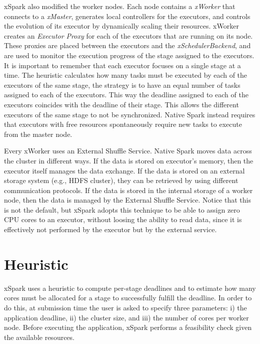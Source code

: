 xSpark also modified the worker nodes. Each node contains a \textit{xWorker} that connects to a \textit{xMaster}, generates local controllers for the executors, and controls the evolution of its executor by dynamically scaling their resources. xWorker creates an \textit{Executor Proxy} for each of the executors that are running on its node. These proxies are placed between the executors and the \textit{xSchedulerBackend}, and are used to monitor the execution progress of the stage assigned to the executors. It is important to remember that each executor focuses on a single stage at a time. The heuristic calculates how many tasks must be executed by each of the executors of the same stage, the strategy is to have an equal number of tasks assigned to each of the executors. This way the deadline assigned to each of the executors coincides with the deadline of their stage. This allows the different executors of the same stage to
not be synchronized. Native Spark instead requires that executors with free resources spontaneously require new tasks to execute from the master node. 

Every xWorker uses an External Shuffle Service. Native Spark moves data across the cluster in different ways. If the data is stored on executor’s memory, then the executor itself manages the data exchange. If the data is stored on an external storage system (e.g., HDFS cluster),
they can be retrieved by using different communication protocols. If the data is stored in the internal storage of a worker node, then the data is managed by the External Shuffle Service. Notice that this is not the default, but xSpark adopts this technique to be able to assign
zero CPU cores to an executor, without loosing the ability to read data, since it is effectively not performed by the executor but by the external service.

\section{Heuristic}\label{sec:heuristic}
xSpark uses a heuristic to compute per-stage deadlines and to estimate how many cores must be allocated for a stage to successfully fulfill the deadline. In order to do this, at submission time the user is asked to specify three parameters: i) the application deadline, ii) the cluster size, and iii) the number of cores per worker node. Before executing the application, xSpark performs a feasibility check given the available resources.

